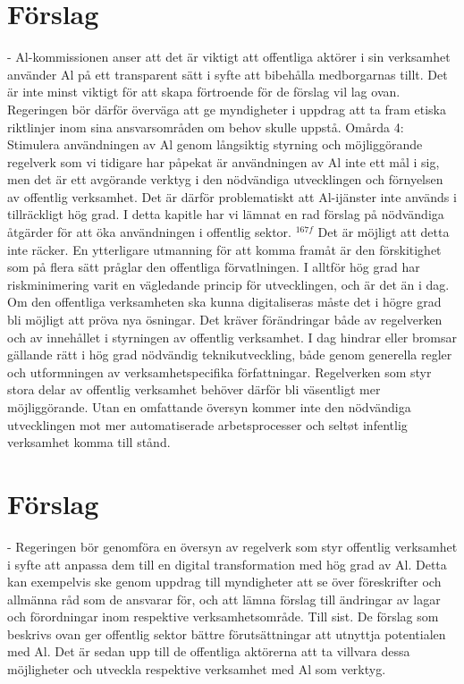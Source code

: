 {{{{{{{{{{{{{{{\section*{Förslag}
- Al-kommissionen anser att det är viktigt att offentliga aktörer i sin verksamhet använder Al på ett transparent sätt i syfte att bibehålla medborgarnas tillt. Det är inte minst viktigt för att skapa förtroende för de förslag vil lag ovan. Regeringen bör därför överväga att ge myndigheter i uppdrag att ta fram etiska riktlinjer inom sina ansvarsområden om behov skulle uppstå.
Omårda 4: Stimulera användningen av Al genom långsiktig styrning och möjliggörande regelverk som vi tidigare har påpekat är användningen av Al inte ett mål i sig, men det är ett avgörande verktyg i den nödvändiga utvecklingen och förnyelsen av offentlig verksamhet. Det är därför problematiskt att Al-ijänster inte används i tillräckligt hög grad. I detta kapitle har vi lämnat en rad förslag på nödvändiga åtgärder för att öka användningen i offentlig sektor. \({ }^{167 f}\)
Det är möjligt att detta inte räcker. En ytterligare utmanning för att komma framåt är den förskitighet som på flera sätt pråglar den offentliga förvatlningen. I alltför hög grad har riskminimering varit en vägledande princip för utvecklingen, och är det än i dag. Om den offentliga verksamheten ska kunna digitaliseras måste det i högre grad bli möjligt att pröva nya ösningar. Det kräver förändringar både av regelverken och av innehållet i styrningen av offentlig verksamhet.
I dag hindrar eller bromsar gällande rätt i hög grad nödvändig teknikutveckling, både genom generella regler och utformningen av verksamhetspecifika författningar. Regelverken som styr stora delar av offentlig verksamhet behöver därför bli väsentligt mer möjliggörande. Utan en omfattande översyn kommer inte den nödvändiga utvecklingen mot mer automatiserade arbetsprocesser och seltøt infentlig verksamhet komma till stånd.
\section*{Förslag}
- Regeringen bör genomföra en översyn av regelverk som styr offentlig verksamhet i syfte att anpassa dem till en digital transformation med hög grad av Al. Detta kan exempelvis ske genom uppdrag till myndigheter att se över föreskrifter och allmänna råd som de ansvarar för, och att lämna förslag till ändringar av lagar och förordningar inom respektive verksamhetsområde.
Till sist. De förslag som beskrivs ovan ger offentlig sektor bättre förutsättningar att utnyttja potentialen med Al. Det är sedan upp till de offentliga aktörerna att ta villvara dessa möjligheter och utveckla respektive verksamhet med Al som verktyg.

}}}}}}}}}}}}}}}
